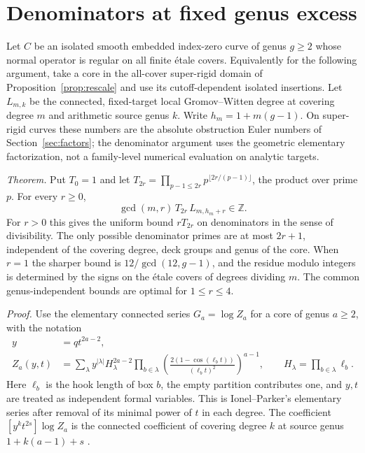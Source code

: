 \section{Denominators at fixed genus excess}\label{sec:excess}
Let \(C\) be an isolated smooth embedded index-zero curve of genus \(g\ge2\) whose normal operator is regular on all finite étale covers. Equivalently for the following argument, take a core in the all-cover super-rigid domain of Proposition~\ref{prop:rescale} and use its cutoff-dependent isolated insertions. Let \(L_{m,k}\) be the connected, fixed-target local Gromov--Witten degree at covering degree \(m\) and arithmetic source genus \(k\). Write \(h_m=1+m(g-1)\). On super-rigid curves these numbers are the absolute obstruction Euler numbers of Section~\ref{sec:factors}; the denominator argument uses the geometric elementary factorization, not a family-level numerical evaluation on analytic targets.

\emph{Theorem.} Put \(T_0=1\) and let \(T_{2r}=\prod_{p-1\le2r} p^{\lfloor2r/(p-1)\rfloor}\), the product over prime \(p\). For every \(r\ge0\),
\[\gcd(m,r)\,T_{2r}\,L_{m,h_m+r}\in\mathbb Z .\]
For \(r>0\) this gives the uniform bound \(rT_{2r}\) on denominators in the sense of divisibility. The only possible denominator primes are at most \(2r+1\), independent of the covering degree, deck groups and genus of the core. When \(r=1\) the sharper bound is \(12/\gcd(12,g-1)\), and the residue modulo integers is determined by the signs on the étale covers of degrees dividing \(m\). The common genus-independent bounds are optimal for \(1\le r\le4\).

\emph{Proof.} Use the elementary connected series \(G_a=\log Z_a\) for a core of genus \(a\ge2\), with the notation
\[\begin{aligned}
 y&=qt^{2a-2},\\
 Z_a(y,t)&=\sum_{\lambda}y^{|\lambda|}
    H_\lambda^{2a-2}\prod_{b\in\lambda}
    \left(\frac{2(1-\cos(\ell_b t))}{(\ell_b t)^2}\right)^{a-1},
 \qquad H_\lambda=\prod_{b\in\lambda}\ell_b .
\end{aligned}\]
Here \(\ell_b\) is the hook length of box \(b\), the empty partition contributes one, and \(y,t\) are treated as independent formal variables. This is Ionel--Parker's elementary series after removal of its minimal power of \(t\) in each degree. The coefficient \([y^kt^{2s}]\log Z_a\) is the connected coefficient of covering degree \(k\) at source genus \(1+k(a-1)+s\) \cite{ip} \cite{WueProduct}.

